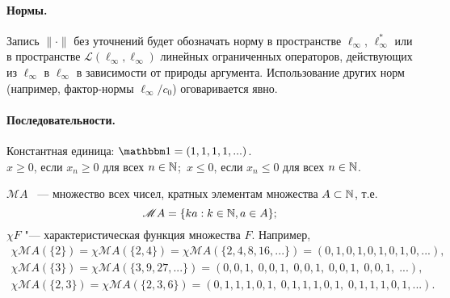 \paragraph{Нормы.}
Запись $\|\cdot\|$ без уточнений будет обозначать норму в пространстве $\ell_\infty$, $\ell_\infty^*$
или в пространстве  $\mathcal L (\ell_\infty, \ell_\infty)$ линейных ограниченных операторов, действующих из $\ell_\infty$ в $\ell_\infty$ в зависимости от природы аргумента.
Использование других норм (например, фактор-нормы $\ell_\infty / c_0$)
оговаривается явно.

\newpage


\paragraph{Последовательности.} Константная единица: $\one = (1, 1, 1, 1, ...)$.
%
\\
$x\geq 0$, если $x_n \geq 0$ для всех $n\in \mathbb{N}$;\hfill~$x\leq 0$, если $x_n \leq 0$ для всех $n\in \mathbb{N}$.

$\mathscr{M}A$ ~--- множество всех чисел,
кратных элементам множества $A\subset\mathbb{N}$, т.е.
\begin{equation}
	\mathscr{M}A = \{ka: k\in\mathbb{N}, a\in A\}
	;
\end{equation}
$\chi F$ "--- характеристическая функция множества $F$.
Например,
\begin{gather}
	\chi \mathscr{M}\!A(\{2\}) = \chi \mathscr{M}\!A(\{2, 4\}) = \chi \mathscr{M}\!A(\{2,4,8,16,...\})
	= (0,1,0,1,0,1,0,1,0,...),
\\
	\chi \mathscr{M}\!A(\{3\}) = \chi \mathscr{M}\!A(\{3,9,27,...\}) = (0,0,1,\;0,0,1,\;0,0,1,\;0,0,1,\;0,0,1,\;...),
\\
	\chi \mathscr{M}\!A(\{2,3\}) = \chi \mathscr{M}\!A(\{2,3,6\}) = (0,1,1,1,0,1,\;0,1,1,1,0,1,\;0,1,1,1,0,1,...).
\end{gather}


